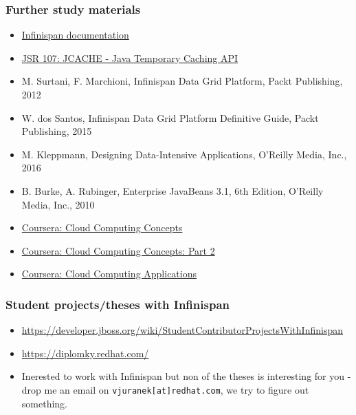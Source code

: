 \documentclass[10pt,utf8]{beamer}
\begin{document}
\begin{frame}
	\frametitle{Further study materials}
	\begin{itemize}
		\item \color{blue}\href{http://infinispan.org/documentation/}{Infinispan documentation}
		\item \href{https://jcp.org/en/jsr/detail?id=107}{JSR 107: JCACHE - Java Temporary Caching API}\color{black}
		\item M. Surtani, F. Marchioni, Infinispan Data Grid Platform,  Packt Publishing, 2012
		\item W. dos Santos, Infinispan Data Grid Platform Definitive Guide, Packt Publishing, 2015
		\item M. Kleppmann, Designing Data-Intensive Applications, O'Reilly Media, Inc., 2016
		\vspace{0.5cm}
		\item  B. Burke, A. Rubinger, Enterprise JavaBeans 3.1, 6th Edition,  O'Reilly Media, Inc., 2010
		\vspace{0.5cm}
		\color{blue}
		\item \href{https://www.coursera.org/course/cloudcomputing}{Coursera: Cloud Computing Concepts}
		\item \href{https://www.coursera.org/course/cloudcomputing2}{Coursera: Cloud Computing Concepts: Part 2}
		\item \href{https://www.coursera.org/course/cloudapplications}{Coursera: Cloud Computing Applications}
	\end{itemize}
\end{frame}

\begin{frame}
	\frametitle{Student projects/theses with Infinispan}
	\begin{itemize}
		\item \scriptsize{\url{https://developer.jboss.org/wiki/StudentContributorProjectsWithInfinispan}}\\
		\item \url{https://diplomky.redhat.com/}
		\item Inerested to work with Infinispan but non of the theses is interesting for you - drop me an email on \texttt{vjuranek[at]redhat.com}, we try to figure out something.
	\end{itemize}
\end{frame}
\end{document}

